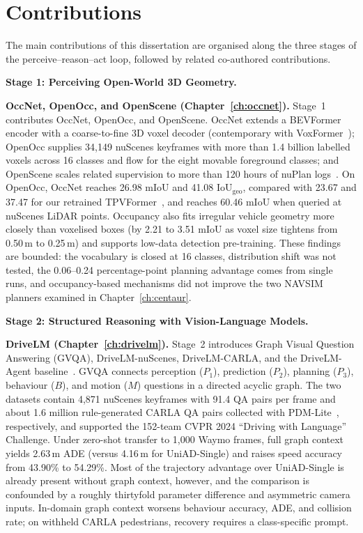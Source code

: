 \section{Contributions}\label{sec:intro:contributions}

The main contributions of this dissertation are organised along the three stages of the perceive--reason--act loop, followed by related co-authored contributions.

\medskip
\noindent\textbf{Stage 1: Perceiving Open-World 3D Geometry.}

\noindent\textbf{OccNet, OpenOcc, and OpenScene (Chapter~\ref{ch:occnet}).}
Stage~1 contributes OccNet, OpenOcc, and OpenScene. OccNet extends a BEVFormer encoder with a coarse-to-fine 3D voxel decoder (contemporary with VoxFormer~\cite{li2023voxformer}); OpenOcc supplies 34,149 nuScenes keyframes with more than 1.4 billion labelled voxels across 16 classes and flow for the eight movable foreground classes; and OpenScene scales related supervision to more than 120 hours of nuPlan logs~\cite{sima2023occnet,sima2023openscene}. On OpenOcc, OccNet reaches 26.98 mIoU and 41.08 $\text{IoU}_{\text{geo}}$, compared with 23.67 and 37.47 for our retrained TPVFormer~\cite{huang2023tpvformer}, and reaches 60.46 mIoU when queried at nuScenes LiDAR points. Occupancy also fits irregular vehicle geometry more closely than voxelised boxes (by 2.21 to 3.51 mIoU as voxel size tightens from 0.50\,m to 0.25\,m) and supports low-data detection pre-training. These findings are bounded: the vocabulary is closed at 16 classes, distribution shift was not tested, the 0.06--0.24 percentage-point planning advantage comes from single runs, and occupancy-based mechanisms did not improve the two NAVSIM planners examined in Chapter~\ref{ch:centaur}.

\medskip
\noindent\textbf{Stage 2: Structured Reasoning with Vision-Language Models.}

\noindent\textbf{DriveLM (Chapter~\ref{ch:drivelm}).}
Stage~2 introduces Graph Visual Question Answering (GVQA), DriveLM-nuScenes, DriveLM-CARLA, and the DriveLM-Agent baseline~\cite{sima2024drivelm}. GVQA connects perception ($P_1$), prediction ($P_2$), planning ($P_3$), behaviour ($B$), and motion ($M$) questions in a directed acyclic graph. The two datasets contain 4,871 nuScenes keyframes with 91.4 QA pairs per frame and about 1.6 million rule-generated CARLA QA pairs collected with PDM-Lite~\cite{beisswenger2024pdmlite}, respectively, and supported the 152-team CVPR 2024 ``Driving with Language'' Challenge. Under zero-shot transfer to 1,000 Waymo frames, full graph context yields 2.63\,m ADE (versus 4.16\,m for UniAD-Single) and raises speed accuracy from 43.90\% to 54.29\%. Most of the trajectory advantage over UniAD-Single is already present without graph context, however, and the comparison is confounded by a roughly thirtyfold parameter difference and asymmetric camera inputs. In-domain graph context worsens behaviour accuracy, ADE, and collision rate; on withheld CARLA pedestrians, recovery requires a class-specific prompt.

